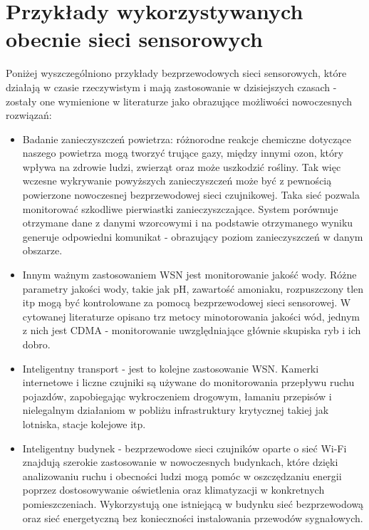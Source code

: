 \documentclass[12pt, twoside, hidelinks, a4paper]{article}
\begin{document}
\section{Przykłady wykorzystywanych obecnie sieci sensorowych}
Poniżej wyszczególniono przykłady bezprzewodowych sieci sensorowych, które działają w czasie rzeczywistym i mają zastosowanie w dzisiejszych czasach - zostały one wymienione w literaturze jako obrazujące możliwości nowoczesnych rozwiązań:
\begin{itemize}
\item Badanie zanieczyszczeń powietrza: różnorodne reakcje chemiczne dotyczące naszego powietrza mogą tworzyć trujące gazy, między innymi ozon, który wpływa na zdrowie ludzi, zwierząt oraz może uszkodzić rośliny. Tak więc wczesne wykrywanie powyższych zanieczyszczeń może być z pewnością powierzone nowoczesnej bezprzewodowej sieci czujnikowej. Taka sieć pozwala monitorować szkodliwe pierwiastki zanieczyszczające\cite{c4}. System porównuje otrzymane dane z danymi wzorcowymi i  na podstawie otrzymanego wyniku generuje odpowiedni komunikat - obrazujący poziom zanieczyszczeń w danym obszarze.
\item Innym ważnym zastosowaniem WSN jest monitorowanie jakość wody. Różne parametry jakości wody, takie jak pH, zawartość amoniaku, rozpuszczony tlen itp mogą być kontrolowane za pomocą bezprzewodowej sieci sensorowej. W cytowanej literaturze opisano trz metocy minotorowania jakości wód\cite{c4}, jednym z nich jest CDMA - monitorowanie uwzględniające głównie skupiska ryb i ich dobro.
\item Inteligentny transport - jest to kolejne zastosowanie WSN. Kamerki internetowe i liczne czujniki są używane do monitorowania przepływu ruchu pojazdów, zapobiegając wykroczeniem drogowym, łamaniu przepisów i nielegalnym działaniom w pobliżu infrastruktury krytycznej takiej jak lotniska, stacje kolejowe itp.
\item Inteligentny budynek - bezprzewodowe sieci czujników oparte o sieć Wi-Fi znajdują szerokie zastosowanie w nowoczesnych budynkach, które dzięki analizowaniu ruchu i obecności ludzi mogą pomóc w oszczędzaniu energii poprzez dostosowywanie oświetlenia oraz klimatyzacji w konkretnych pomieszczeniach. Wykorzystują one istniejącą w budynku sieć bezprzewodową oraz sieć energetyczną bez konieczności instalowania przewodów sygnałowych.\cite{c3}
\end{itemize}

\printbibliography
\end{document}
